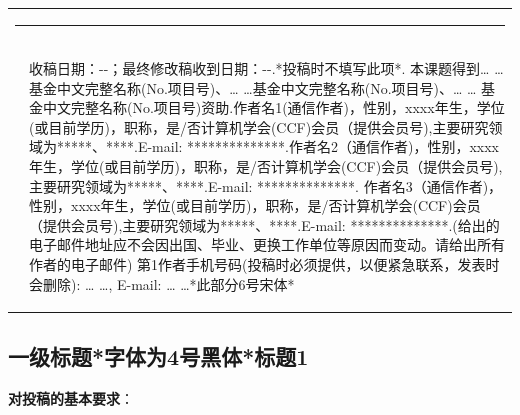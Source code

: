 \documentclass[10.5pt,compsoc]{CjC}
\theoremstyle{mystyle}
\begin{document}
\begin{table}[!t]
\setlength{\tabcolsep}{2pt}
\begin{tabular}{p{0.05cm}p{16.15cm}}
\multicolumn{2}{l}{\rule[4mm]{40mm}{0.1mm}}\\[-3mm]
&\begin{CJK*}{GBK}{gbsn}
收稿日期：\quad \quad -\quad -\quad ；最终修改稿收到日期：\quad \quad -\quad -\quad .*投稿时不填写此项*. 本课题得到… …基金中文完整名称(No.项目号)、… …基金中文完整名称(No.项目号)、… … 基金中文完整名称(No.项目号)资助.作者名1(通信作者)，性别，xxxx年生，学位(或目前学历)，职称，是/否计算机学会(CCF)会员（提供会员号),主要研究领域为*****、****.E-mail: **************.作者名2（通信作者)，性别，xxxx年生，学位(或目前学历)，职称，是/否计算机学会(CCF)会员（提供会员号),主要研究领域为*****、****.E-mail: **************. 作者名3（通信作者)，性别，xxxx年生，学位(或目前学历)，职称，是/否计算机学会(CCF)会员（提供会员号),主要研究领域为*****、****.E-mail: **************.(给出的电子邮件地址应不会因出国、毕业、更换工作单位等原因而变动。请给出所有作者的电子邮件)
第1作者手机号码(投稿时必须提供，以便紧急联系，发表时会删除): … …, E-mail: … …*此部分6号宋体*
\end{CJK*}
\end{tabular}\end{table}
\clearpage\clearpage
\begin{strip}
\vspace {-13mm}
\end{strip}
    \linespread{1.15}
\begin{CJK*}{GBK}{hei}
\vskip 1mm
\section{一级标题*字体为4号黑体*标题1}
\textbf{对投稿的基本要求}：
\end{CJK*}
\end{document}
